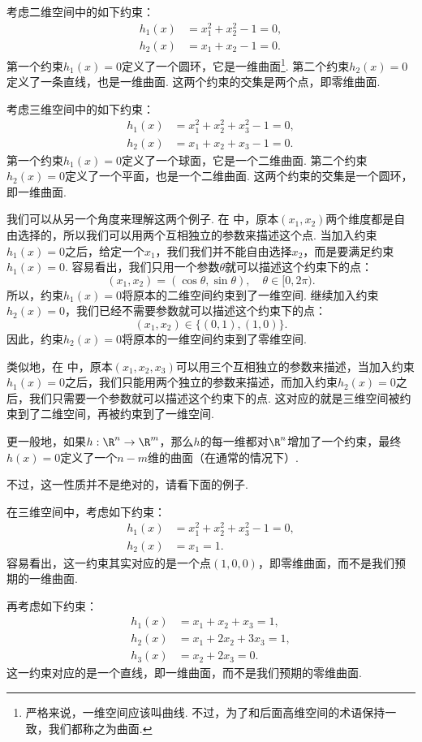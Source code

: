 \begin{example}[二维空间中的约束]\label{ex:2d-constraint}
考虑二维空间中的如下约束：
\begin{align*}
    h_1(x)&=x_1^2+x_2^2-1=0,\\
    h_2(x)&=x_1+x_2-1=0.
\end{align*}
第一个约束$h_1(x)=0$定义了一个圆环，它是一维曲面\footnote{严格来说，一维空间应该叫曲线. 不过，为了和后面高维空间的术语保持一致，我们都称之为曲面. }. 第二个约束$h_2(x)=0$定义了一条直线，也是一维曲面. 这两个约束的交集是两个点，即零维曲面.
\end{example}

\begin{example}[三维空间中的约束]\label{ex:3d-constraint}
考虑三维空间中的如下约束：
\begin{align*}
    h_1(x)&=x_1^2+x_2^2+x_3^2-1=0,\\
    h_2(x)&=x_1+x_2+x_3-1=0.
\end{align*}
第一个约束$h_1(x)=0$定义了一个球面，它是一个二维曲面. 第二个约束$h_2(x)=0$定义了一个平面，也是一个二维曲面. 这两个约束的交集是一个圆环，即一维曲面.
\end{example}

我们可以从另一个角度来理解这两个例子. 在 中，原本$(x_1,x_2)$两个维度都是自由选择的，所以我们可以用两个互相独立的参数来描述这个点. 当加入约束$h_1(x)=0$之后，给定一个$x_1$，我们我们并不能自由选择$x_2$，而是要满足约束$h_1(x)=0$. 容易看出，我们只用一个参数$\theta$就可以描述这个约束下的点：
\[
(x_1,x_2)=(\cos\theta,\sin\theta),\quad \theta\in[0,2\pi).
\]
所以，约束$h_1(x)=0$将原本的二维空间约束到了一维空间. 继续加入约束$h_2(x)=0$，我们已经不需要参数就可以描述这个约束下的点：
\[
(x_1,x_2)\in\{(0,1),(1,0)\}.
\]
因此，约束$h_2(x)=0$将原本的一维空间约束到了零维空间.

类似地，在 中，原本$(x_1,x_2,x_3)$可以用三个互相独立的参数来描述，当加入约束$h_1(x)=0$之后，我们只能用两个独立的参数来描述，而加入约束$h_2(x)=0$之后，我们只需要一个参数就可以描述这个约束下的点. 这对应的就是三维空间被约束到了二维空间，再被约束到了一维空间.

更一般地，如果$h:\R^n\to\R^m$，那么$h$的每一维都对$\R^n$增加了一个约束，最终$h(x)=0$定义了一个$n-m$维的曲面（在通常的情况下）. 

不过，这一性质并不是绝对的，请看下面的例子. 

\begin{example}\label{ex:3d-constraint-2}
在三维空间中，考虑如下约束：
\begin{align*}
    h_1(x)&=x_1^2+x_2^2+x_3^2-1=0,\\
    h_2(x)&=x_1=1.
\end{align*}
容易看出，这一约束其实对应的是一个点$(1,0,0)$，即零维曲面，而不是我们预期的一维曲面.

再考虑如下约束：
\begin{align*}
    h_1(x)&=x_1+x_2+x_3=1,\\
    h_2(x)&=x_1+2x_2+3x_3=1,\\
    h_3(x)&=x_2+2x_3=0.
\end{align*}
这一约束对应的是一个直线，即一维曲面，而不是我们预期的零维曲面.
\end{example}

